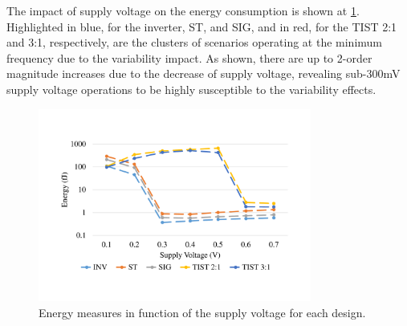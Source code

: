 \documentclass[diss,pgmicro,english]{iiufrgs}
\begin{document}
The impact of supply voltage on the energy consumption is shown at \ref{fig:energySupplyStep}. Highlighted in blue, for the inverter, ST, and SIG, and in red, for the TIST 2:1 and 3:1, respectively, are the clusters of scenarios operating at the minimum frequency due to the variability impact. As shown, there are up to 2-order magnitude increases due to the decrease of supply voltage, revealing sub-300mV supply voltage operations to be highly susceptible to the variability effects.


\begin{figure}[h]
	\centering
		\includegraphics[width=0.8\textwidth, trim={2cm 3cm 2cm 3cm}, clip]{energyIncreaseSupply.pdf}
		\caption{Energy measures in function of the supply voltage for each design.}
	\label{fig:energySupplyStep}
\end{figure}

\end{document}

